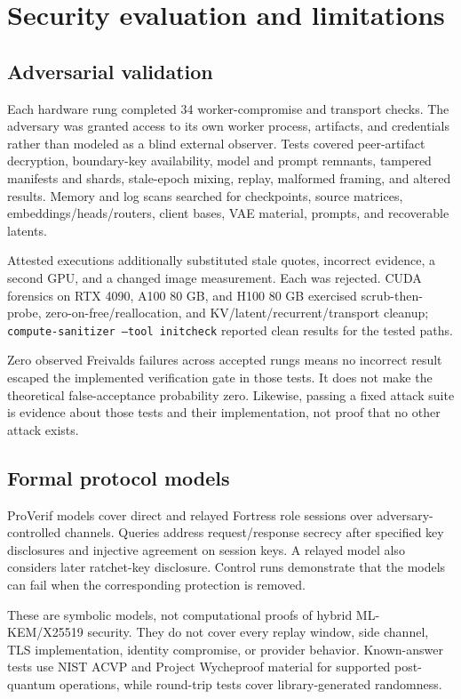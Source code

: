 \section{Security evaluation and limitations}\label{sec:security-evaluation}

\subsection{Adversarial validation}

Each hardware rung completed 34 worker-compromise and transport checks. The adversary was granted access to its own worker process, artifacts, and credentials rather than modeled as a blind external observer. Tests covered peer-artifact decryption, boundary-key availability, model and prompt remnants, tampered manifests and shards, stale-epoch mixing, replay, malformed framing, and altered results. Memory and log scans searched for checkpoints, source matrices, embeddings/heads/routers, client bases, VAE material, prompts, and recoverable latents.

Attested executions additionally substituted stale quotes, incorrect evidence, a second GPU, and a changed image measurement. Each was rejected. CUDA forensics on RTX 4090, A100 80 GB, and H100 80 GB exercised scrub-then-probe, zero-on-free/reallocation, and KV/latent/recurrent/transport cleanup; \texttt{compute-sanitizer --tool initcheck} reported clean results for the tested paths.

Zero observed Freivalds failures across accepted rungs means no incorrect result escaped the implemented verification gate in those tests. It does not make the theoretical false-acceptance probability zero. Likewise, passing a fixed attack suite is evidence about those tests and their implementation, not proof that no other attack exists.

\subsection{Formal protocol models}

ProVerif models cover direct and relayed Fortress role sessions over adversary-controlled channels. Queries address request/response secrecy after specified key disclosures and injective agreement on session keys. A relayed model also considers later ratchet-key disclosure. Control runs demonstrate that the models can fail when the corresponding protection is removed.

These are symbolic models, not computational proofs of hybrid ML-KEM/X25519 security. They do not cover every replay window, side channel, TLS implementation, identity compromise, or provider behavior. Known-answer tests use NIST ACVP and Project Wycheproof material for supported post-quantum operations, while round-trip tests cover library-generated randomness.

